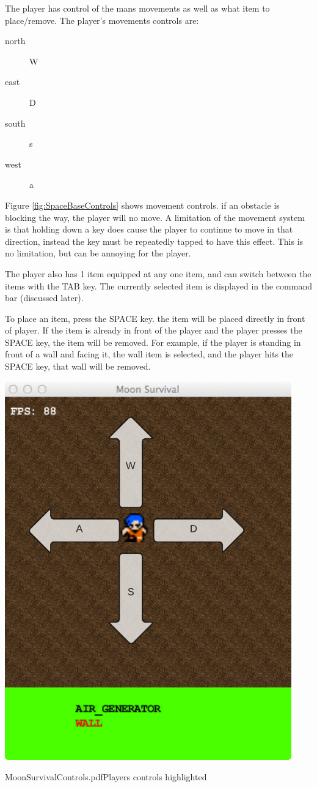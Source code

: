 The player has control of the mans movements as well as what item to place/remove.
The player's movements controls are:
\begin{description}
\item [north] W
\item [east] D
\item [south] s
\item [west] a
\end{description}
Figure \ref{fig:SpaceBaseControls} shows movement controls.
if an obstacle is blocking the way, the player will no move.
A limitation of the movement system is that holding down a key does cause the player to continue to move in that direction, instead the key must be repeatedly tapped to have this effect. This is no limitation, but can be annoying for the player.

The player also has 1 item equipped at any one item, and can switch between the items with the TAB key. The currently selected item is displayed in the command bar (discussed later).

To place an item, press the SPACE key. the item will be placed directly in front of player. 
If the item is already in front of the player and the player presses the SPACE key, the item will be removed.
For example, if the player is standing in front of a wall and facing it, the wall item is selected, and the player hits the SPACE key, that wall will be removed.

\begin{marginfigure}
	\includegraphics{res/space_base_prototype/MoonSurvivalControls.pdf}
	\caption{MoonSurvivalControls.pdfPlayers controls highlighted}
	\label{fig:SpaceBaseControls}
\end{marginfigure}



